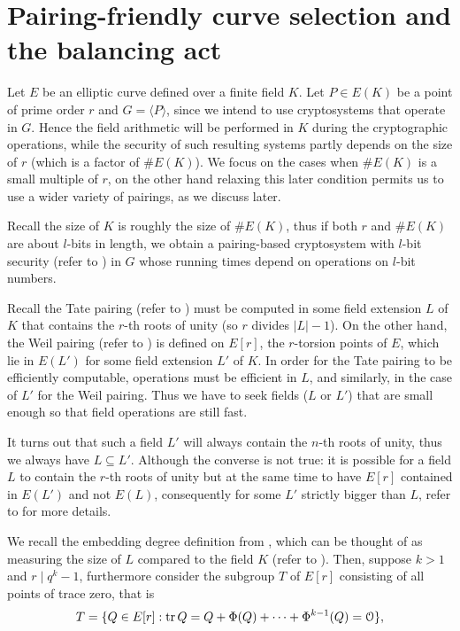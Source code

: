 

\section{Pairing-friendly curve selection and the balancing act}
\label{sec:curveselection}


Let $E$ be an elliptic curve defined over a finite field $K$. Let $P \in E(K)$ be a point of prime order $r$ and $G = \langle P \rangle$, since we  intend to use cryptosystems that operate in $G$. Hence the field arithmetic will be performed in $K$ during the cryptographic operations, while the security of such resulting systems partly depends on the size of $r$ (which is a factor of $\#E(K)$). We focus on the cases when $\#E(K)$ is a small multiple of $r$, on the other hand relaxing this later condition permits us to use a wider variety of pairings, as we discuss later. 

Recall the size of $K$ is roughly the size of $\#E(K)$, thus if both $r$ and $\#E(K)$ are about $l$-bits in length, we obtain a pairing-based cryptosystem with $l$-bit security (refer  to ) in $G$ whose running times depend on operations on $l$-bit numbers.

Recall the Tate pairing (refer to  ) must be computed in some field extension $L$ of $K$ that contains the $r$-th roots of unity (so $r$ divides $|L| - 1$). On the other hand, the Weil pairing (refer to ) is defined on $E[r]$, the $r$-torsion points of $E$, which lie in $E(L')$ for some field extension $L'$ of $K$. In order for the Tate pairing to be efficiently computable, operations must be efficient in $L$, and similarly, in the case of $L'$ for  the Weil pairing. Thus we have to seek fields ($L$ or $L'$) that are small enough so that field operations are still fast.

It turns out that such a field $L'$ will always contain the $n$-th roots of unity, thus we always have $L \subseteq L'$. Although the converse is not true: it is possible for a field $L$ to contain the $r$-th roots of unity but at the same time to have $E[r]$ contained in $E(L')$ and not $E(L)$, consequently for some $L'$ strictly bigger than $L$, refer to \cite{BK98}  for more details.


We recall the embedding degree definition from ,  which can be thought of as measuring the size of $L$ compared to the field $K$ (refer to ). Then, suppose $k > 1$ and $r \mid q^k - 1$, furthermore consider the subgroup $T$ of $E[r]$ consisting of all points of trace zero, that is
$$T = \{Q \in E[r] : \text{tr}\, Q = Q + \Phi(Q) + \cdots + \Phi^{k-1}(Q) = \EuScript{O}\},$$

